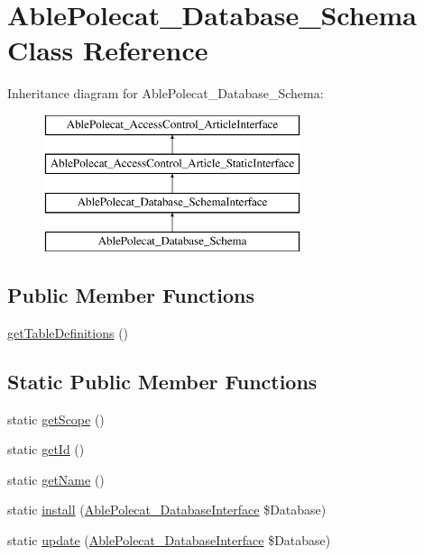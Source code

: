 \hypertarget{class_able_polecat___database___schema}{}\section{Able\+Polecat\+\_\+\+Database\+\_\+\+Schema Class Reference}
\label{class_able_polecat___database___schema}
Inheritance diagram for Able\+Polecat\+\_\+\+Database\+\_\+\+Schema\+:\begin{figure}[H]
\begin{center}
\leavevmode
\includegraphics[height=4.000000cm]{class_able_polecat___database___schema}
\end{center}
\end{figure}
\subsection*{Public Member Functions}
\begin{DoxyCompactItemize}
\item 
\hyperlink{class_able_polecat___database___schema_a73aa038e374cfd590b1605a541498eb0}{get\+Table\+Definitions} ()
\end{DoxyCompactItemize}
\subsection*{Static Public Member Functions}
\begin{DoxyCompactItemize}
\item 
static \hyperlink{class_able_polecat___database___schema_ad9ade868bd136d32967059d1cccb3e92}{get\+Scope} ()
\item 
static \hyperlink{class_able_polecat___database___schema_acfaa3a96d0cb5a4c0d4d710dcba41e9e}{get\+Id} ()
\item 
static \hyperlink{class_able_polecat___database___schema_a4ef9bd37ba3ce8a13c1e8bcf4f72a630}{get\+Name} ()
\item 
static \hyperlink{class_able_polecat___database___schema_a97e9bacf538c072e0542eeb96d2475af}{install} (\hyperlink{interface_able_polecat___database_interface}{Able\+Polecat\+\_\+\+Database\+Interface} \$Database)
\item 
static \hyperlink{class_able_polecat___database___schema_a8398510e79e9787266fe116d6431948c}{update} (\hyperlink{interface_able_polecat___database_interface}{Able\+Polecat\+\_\+\+Database\+Interface} \$Database)
\end{DoxyCompactItemize}
